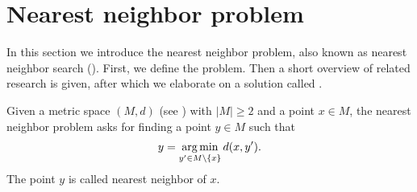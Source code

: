 \section{Nearest neighbor problem}\label{nearestNeighborProblem}
	In this section we introduce the nearest neighbor problem, also known as nearest neighbor search (\nns).
	First, we define the problem. Then a short overview of related research is given, after which we elaborate on
	a solution called {\coverTree} .
	\begin{mydef}
		Given a metric space $(M, d)$ (see ) with $|M| \ge 2$ and a point $x \in M$,
		the \textnormal{nearest neighbor problem} asks for finding a point $y \in M$ such that
		\begin{align*}
			y = \operatorname*{arg\,min}_{y' \in M \setminus \{x\}} d(x, y').
		\end{align*}
		The point $y$ is called \textnormal{nearest neighbor} of $x$.
	\end{mydef}

